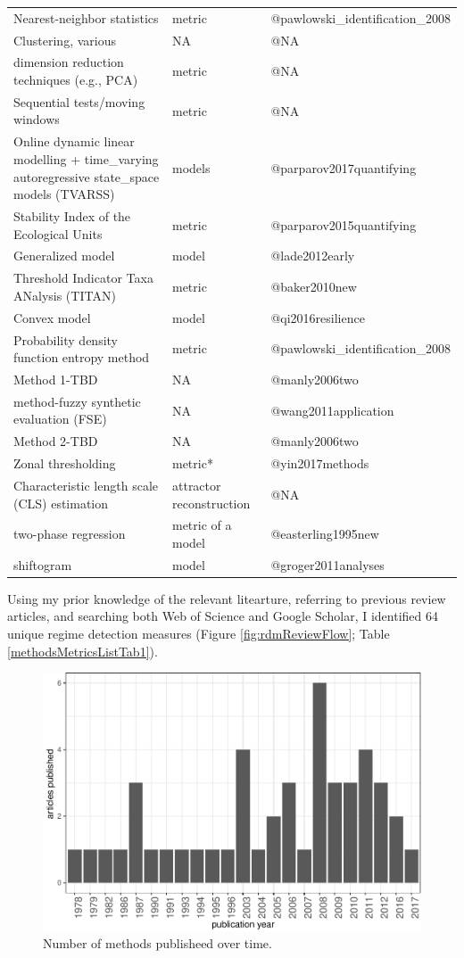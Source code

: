 \documentclass[12pt,twoside,openany]{reedthesis}
\begin{document}
\begin{longtable}{lll}
Nearest-neighbor statistics & metric & @pawlowski\_identification\_2008\\
Clustering, various & NA & @NA\\
dimension reduction techniques (e.g., PCA) & metric & @NA\\
\addlinespace
Sequential tests/moving windows & metric & @NA\\
Online dynamic linear modelling +  time\_varying autoregressive state\_space models (TVARSS) & models & @parparov2017quantifying\\
Stability Index of the Ecological Units & metric & @parparov2015quantifying\\
Generalized model & model & @lade2012early\\
Threshold Indicator Taxa ANalysis (TITAN) & metric & @baker2010new\\
\addlinespace
Convex model & model & @qi2016resilience\\
Probability density function entropy method & metric & @pawlowski\_identification\_2008\\
Method 1-TBD & NA & @manly2006two\\
method-fuzzy synthetic evaluation (FSE) & NA & @wang2011application\\
Method 2-TBD & NA & @manly2006two\\
\addlinespace
Zonal thresholding & metric* & @yin2017methods\\
Characteristic length scale (CLS) estimation & attractor reconstruction & @NA\\
two-phase regression & metric of a model & @easterling1995new\\
shiftogram & model & @groger2011analyses\\*
\end{longtable}
Using my prior knowledge of the relevant litearture, referring to
previous review articles, and searching both Web of Science and Google
Scholar, I identified 64 unique regime detection measures (Figure
\ref{fig:rdmReviewFlow}; Table \ref{methodsMetricsListTab1}).
\begin{figure}
\centering
\includegraphics{_myDissertation_files/figure-latex/jrnlYearFig-1.pdf}
\caption{\label{fig:jrnlYearFig}Number of methods publisheed over time.}
\end{figure}
\end{document}

